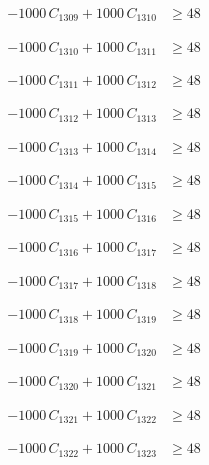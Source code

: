 \documentclass[a4paper,11pt]{article}
\begin{document}
\begin{align}
-1000\,C_{1309} + 1000\,C_{1310} &\geq 48 \nonumber
\end{align}

\begin{align}
-1000\,C_{1310} + 1000\,C_{1311} &\geq 48 \nonumber
\end{align}

\begin{align}
-1000\,C_{1311} + 1000\,C_{1312} &\geq 48 \nonumber
\end{align}

\begin{align}
-1000\,C_{1312} + 1000\,C_{1313} &\geq 48 \nonumber
\end{align}

\begin{align}
-1000\,C_{1313} + 1000\,C_{1314} &\geq 48 \nonumber
\end{align}

\begin{align}
-1000\,C_{1314} + 1000\,C_{1315} &\geq 48 \nonumber
\end{align}

\begin{align}
-1000\,C_{1315} + 1000\,C_{1316} &\geq 48 \nonumber
\end{align}

\begin{align}
-1000\,C_{1316} + 1000\,C_{1317} &\geq 48 \nonumber
\end{align}

\begin{align}
-1000\,C_{1317} + 1000\,C_{1318} &\geq 48 \nonumber
\end{align}

\begin{align}
-1000\,C_{1318} + 1000\,C_{1319} &\geq 48 \nonumber
\end{align}

\begin{align}
-1000\,C_{1319} + 1000\,C_{1320} &\geq 48 \nonumber
\end{align}

\begin{align}
-1000\,C_{1320} + 1000\,C_{1321} &\geq 48 \nonumber
\end{align}

\begin{align}
-1000\,C_{1321} + 1000\,C_{1322} &\geq 48 \nonumber
\end{align}

\begin{align}
-1000\,C_{1322} + 1000\,C_{1323} &\geq 48 \nonumber
\end{align}
\end{document}
